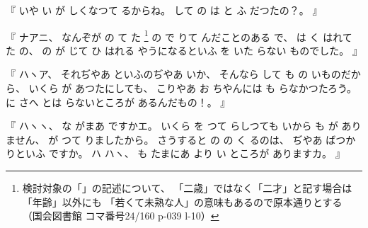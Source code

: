 
%
『
いや
い
が
しくなつて
るからね。
%
して
の
は
と
ふ
だつたの？。
』

%
『
ナアニ、
%
なんぞが
の
て
た
\footnote{%
検討対象の「」の記述について、
「二歳」ではなく「二才」と記す場合は「年齢」以外にも
「若くて未熟な人」の意味もあるので原本通りとする
（国会図書館 コマ番号24/160 p-039 l-10）}%
の
で
りて
んだことのある
で、
%
は
く
はれて
た
の、
%
の
が
じて
ひ
はれる
やうになるといふ
を
いた
らない
ものでした。
』

%
『
ハヽア、
%
それぢやあ
といふのぢやあ
いか、
%
そんなら
して
も
の
いものだから、
%
いくら
が
あつたにしても、
%
こりやあ
お
ちやんには
も
らなかつたろう。
%
に
さへ
とは
らないところが
あるんだもの！。
』

%
『
ハヽヽ、
%
な
がまあ
ですかエ。
%
いくら
を
つて
らしつても
いから
も
が
ありません、
%
%
が
つて
りましたから。
%
さうすると
の
%
の
く
るのは、
%
ぢやあ%
ばつかりといふ
ですか。
%
ハ
ハヽ、%
%
も
たまにあ
より
い
ところが
ありますカ。
』


